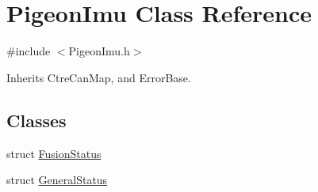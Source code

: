 \hypertarget{class_pigeon_imu}{}\section{Pigeon\+Imu Class Reference}
\label{class_pigeon_imu}


{\ttfamily \#include $<$Pigeon\+Imu.\+h$>$}



Inherits Ctre\+Can\+Map, and Error\+Base.

\subsection*{Classes}
\begin{DoxyCompactItemize}
\item 
struct \hyperlink{struct_pigeon_imu_1_1_fusion_status}{Fusion\+Status}
\item 
struct \hyperlink{struct_pigeon_imu_1_1_general_status}{General\+Status}
\end{DoxyCompactItemize}
